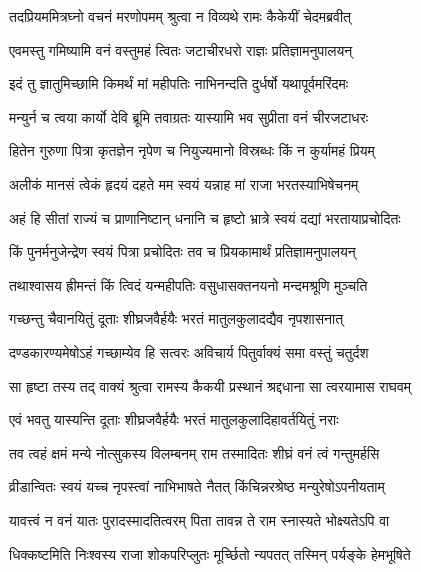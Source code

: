 
\twolineshloka
{तदप्रियममित्रघ्नो वचनं मरणोपमम्}
{श्रुत्वा न विव्यथे रामः कैकेयीं चेदमब्रवीत्} %

\twolineshloka
{एवमस्तु गमिष्यामि वनं वस्तुमहं त्वितः}
{जटाचीरधरो राज्ञः प्रतिज्ञामनुपालयन्} %

\twolineshloka
{इदं तु ज्ञातुमिच्छामि किमर्थं मां महीपतिः}
{नाभिनन्दति दुर्धर्षो यथापूर्वमरिंदमः} %

\twolineshloka
{मन्युर्न च त्वया कार्यो देवि ब्रूमि तवाग्रतः}
{यास्यामि भव सुप्रीता वनं चीरजटाधरः} %

\twolineshloka
{हितेन गुरुणा पित्रा कृतज्ञेन नृपेण च}
{नियुज्यमानो विस्रब्धः किं न कुर्यामहं प्रियम्} %

\twolineshloka
{अलीकं मानसं त्वेकं हृदयं दहते मम}
{स्वयं यन्नाह मां राजा भरतस्याभिषेचनम्} %

\twolineshloka
{अहं हि सीतां राज्यं च प्राणानिष्टान् धनानि च}
{हृष्टो भ्रात्रे स्वयं दद्यां भरतायाप्रचोदितः} %

\twolineshloka
{किं पुनर्मनुजेन्द्रेण स्वयं पित्रा प्रचोदितः}
{तव च प्रियकामार्थं प्रतिज्ञामनुपालयन्} %

\twolineshloka
{तथाश्वासय ह्रीमन्तं किं त्विदं यन्महीपतिः}
{वसुधासक्तनयनो मन्दमश्रूणि मुञ्चति} %

\twolineshloka
{गच्छन्तु चैवानयितुं दूताः शीघ्रजवैर्हयैः}
{भरतं मातुलकुलादद्यैव नृपशासनात्} %

\twolineshloka
{दण्डकारण्यमेषोऽहं गच्छाम्येव हि सत्वरः}
{अविचार्य पितुर्वाक्यं समा वस्तुं चतुर्दश} %

\twolineshloka
{सा हृष्टा तस्य तद् वाक्यं श्रुत्वा रामस्य कैकयी}
{प्रस्थानं श्रद्दधाना सा त्वरयामास राघवम्} %

\twolineshloka
{एवं भवतु यास्यन्ति दूताः शीघ्रजवैर्हयैः}
{भरतं मातुलकुलादिहावर्तयितुं नराः} %

\twolineshloka
{तव त्वहं क्षमं मन्ये नोत्सुकस्य विलम्बनम्}
{राम तस्मादितः शीघ्रं वनं त्वं गन्तुमर्हसि} %

\twolineshloka
{व्रीडान्वितः स्वयं यच्च नृपस्त्वां नाभिभाषते}
{नैतत् किंचिन्नरश्रेष्ठ मन्युरेषोऽपनीयताम्} %

\twolineshloka
{यावत्त्वं न वनं यातः पुरादस्मादतित्वरम्}
{पिता तावन्न ते राम स्नास्यते भोक्ष्यतेऽपि वा} %

\twolineshloka
{धिक्कष्टमिति निःश्वस्य राजा शोकपरिप्लुतः}
{मूर्च्छितो न्यपतत् तस्मिन् पर्यङ्के हेमभूषिते} %

